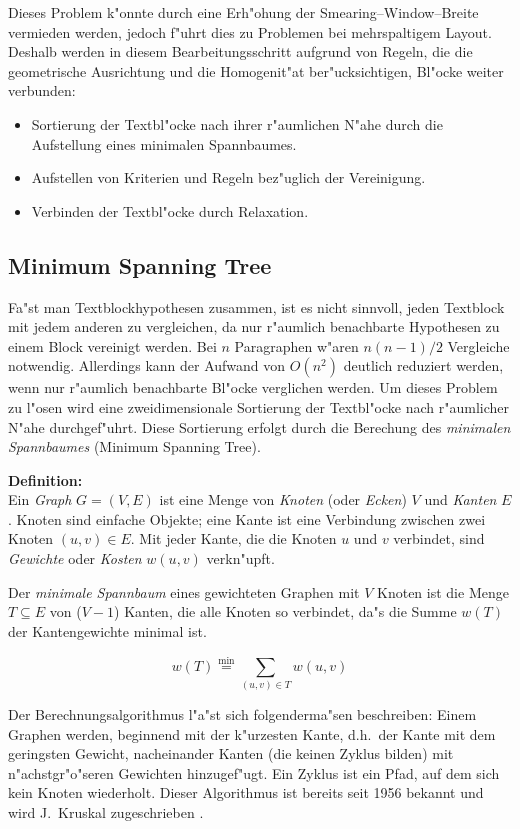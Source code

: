 Dieses Problem k"onnte durch eine Erh"ohung der Smearing--Window--Breite vermieden werden,
jedoch f"uhrt dies zu Problemen bei mehrspaltigem Layout.
Deshalb werden in diesem Bearbeitungsschritt aufgrund von Regeln, die die geometrische Ausrichtung und die Homogenit"at ber"ucksichtigen, Bl"ocke weiter verbunden:
\begin{itemize}
  \item Sortierung der Textbl"ocke nach ihrer r"aumlichen N"ahe durch die Aufstellung eines
        minimalen Spannbaumes.
  \item Aufstellen von Kriterien und Regeln bez"uglich der Vereinigung.
  \item Verbinden der Textbl"ocke durch Relaxation.
\end{itemize}

\subsection{Minimum Spanning Tree}

Fa"st man Textblockhypothesen zusammen, ist es nicht sinnvoll, jeden Textblock mit jedem
anderen zu vergleichen, da nur r"aumlich benachbarte Hypothesen zu einem Block vereinigt werden.
Bei $n$ Paragraphen w"aren $n(n-1)/2$ Vergleiche notwendig.
Allerdings kann der Aufwand von $O(n^2)$ deutlich
reduziert werden, wenn nur r"aumlich benachbarte Bl"ocke verglichen werden.
Um dieses Problem zu l"osen wird eine zweidimensionale Sortierung der Textbl"ocke nach r"aumlicher
N"ahe durchgef"uhrt. Diese Sortierung erfolgt durch die Berechung des
  {\em minimalen Spannbaumes\/} (Minimum Spanning Tree).

\newpage
{\bf Definition:}\\
Ein {\em Graph\/} $G=(V,E)$ ist eine Menge von {\em Knoten\/} (oder {\em Ecken\/}) $V$
und {\em Kanten\/} $E$. Knoten sind einfache Objekte; eine Kante ist eine Verbindung
zwischen zwei Knoten $(u,v)\in E$. Mit jeder Kante, die die Knoten $u$ und $v$ verbindet,
sind {\em Gewichte\/} oder {\em Kosten\/} $w(u,v)$ verkn"upft.

Der {\em minimale Spannbaum\/} eines gewichteten Graphen mit $V$ Knoten ist die
Menge $T \subseteq E$ von ($V-1$) Kanten, die alle Knoten so verbindet, da"s die Summe $w(T)$
der Kantengewichte minimal ist.

$$w(T) \stackrel{\scriptstyle\min}{=} \sum_{(u,v) \in T} w(u,v)$$

Der Berechnungsalgorithmus l"a"st sich folgenderma"sen beschreiben:
Einem Graphen werden,
beginnend mit der k"urzesten Kante, d.h.\ der Kante mit dem geringsten Gewicht,
nacheinander Kanten (die keinen Zyklus bilden) mit n"achstgr"o"seren Gewichten hinzugef"ugt.
Ein Zyklus ist ein Pfad, auf dem sich kein Knoten wiederholt.
Dieser Algorithmus ist bereits seit 1956 bekannt und wird J.\ Kruskal zugeschrieben
\cite{Algorithmen}.

